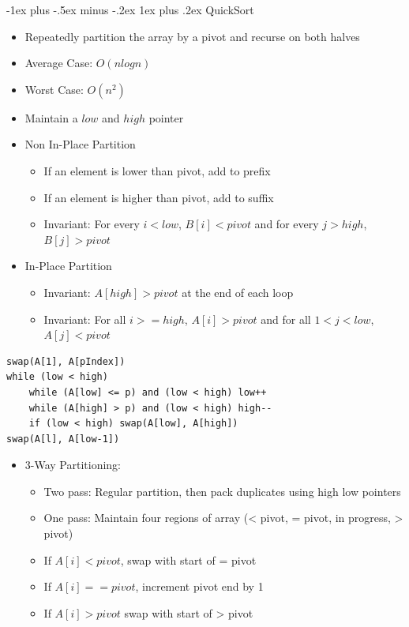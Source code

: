\documentclass[10pt, landscape]{article}
\makeatletter
\renewcommand{\subsection}{\@startsection{subsection}{3}{0mm}%
                                {-1ex plus -.5ex minus -.2ex}%
                                {1ex plus .2ex}%
                                {\normalfont\small\bfseries}}%
\makeatother
\begin{document}
\begin{multicols*}{4}
\subsection{QuickSort}
\begin{itemize}
    \item Repeatedly partition the array by a pivot and recurse on both halves
    \item Average Case: $O(n logn)$
    \item Worst Case: $O(n^2)$
\end{itemize}
\begin{itemize}
    \item Maintain a $low$ and $high$ pointer
    \item Non In-Place Partition
    \begin{itemize}
        \item If an element is lower than pivot, add to prefix
        \item If an element is higher than pivot, add to suffix
        \item Invariant: For every $i < low$, $B[i] < pivot$ and for every $j > high$, $B[j] > pivot$
    \end{itemize}
    \item In-Place Partition
    \begin{itemize}
        \item Invariant: $A[high] > pivot$ at the end of each loop
        \item Invariant: For all $i >= high$, $A[i] > pivot$ and for all $1 < j < low$, $A[j] < pivot$
    \end{itemize}
\end{itemize}
    \begin{verbatim}
swap(A[1], A[pIndex])
while (low < high)
    while (A[low] <= p) and (low < high) low++
    while (A[high] > p) and (low < high) high--
    if (low < high) swap(A[low], A[high])
swap(A[l], A[low-1])
    \end{verbatim}
\begin{itemize}
    \item 3-Way Partitioning:
    \begin{itemize}
        \item Two pass: Regular partition, then pack duplicates using high low pointers
        \item One pass: Maintain four regions of array (< pivot, = pivot, in progress, > pivot)
        \item If $A[i] < pivot$, swap with start of = pivot
        \item If $A[i] == pivot$, increment pivot end by 1
        \item If $A[i] > pivot$  swap with start of > pivot
    \end{itemize}
\end{itemize}


\end{multicols*}
\end{document}
